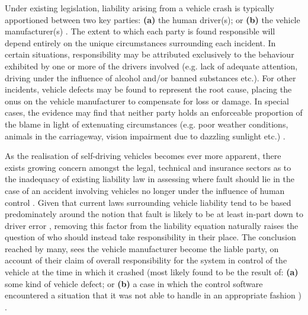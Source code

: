\documentclass[conference]{IEEEtran}
\begin{document}
Under existing legislation, liability arising from a vehicle crash is typically apportioned between two key parties: \textbf{(a)} the human driver(s); or \textbf{(b)} the vehicle manufacturer(s) \cite{marchant}. The extent to which each party is found responsible will depend entirely on the unique circumstances surrounding each incident. In certain situations, responsibility may be attributed exclusively to the behaviour exhibited by one or more of the drivers involved (e.g. lack of adequate attention, driving under the influence of alcohol and/or banned substances etc.). For other incidents, vehicle defects may be found to represent the root cause, placing the onus on the vehicle manufacturer to compensate for loss or damage. In special cases, the evidence may find that neither party holds an enforceable proportion of the blame in light of extenuating circumstances (e.g. poor weather conditions, animals in the carriageway, vision impairment due to dazzling sunlight etc.) \cite{licence-to-skill}. 

As the realisation of self-driving vehicles becomes ever more apparent, there exists growing concern amongst the legal, technical and insurance sectors as to the inadequacy of existing liability law in assessing where fault should lie in the case of an accident involving vehicles no longer under the influence of human control \cite{marchant} \cite{duffy}. Given that current laws surrounding vehicle liability tend to be based predominately around the notion that fault is likely to be at least in-part down to driver error \cite{marchant, beiker}, removing this factor from the liability equation naturally raises the question of who should instead take responsibility in their place. The conclusion reached by many, sees the vehicle manufacturer become the liable party, on account of their claim of overall responsibility for the system in control of the vehicle at the time in which it crashed (most likely found to be the result of: \textbf{(a)} some kind of vehicle defect; or \textbf{(b)} a case in which the control software encountered a situation that it was not able to handle in an appropriate fashion \cite{marchant}) \cite{duffy} \cite{beiker}. 
\end{document}
